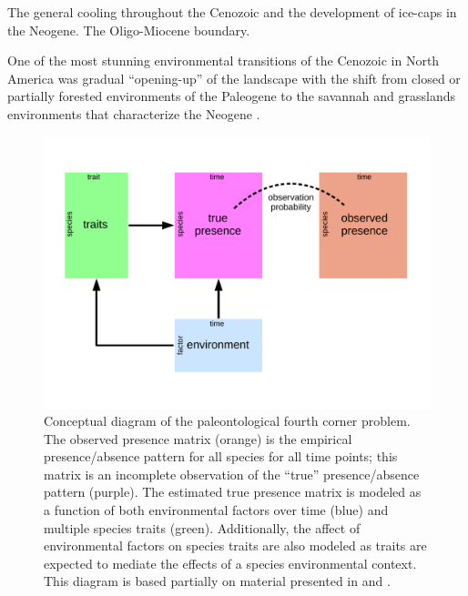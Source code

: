 \documentclass[12pt,letterpaper]{article}
\begin{document}
The general cooling throughout the Cenozoic and the development of ice-caps in the Neogene. The Oligo-Miocene boundary. 

One of the most stunning environmental transitions of the Cenozoic in North America was gradual ``opening-up'' of the landscape with the shift from closed or partially forested environments of the Paleogene to the savannah and grasslands environments that characterize the Neogene \citep{Blois2009,Janis1993a,Janis2000,Stromberg2005}.





\begin{figure}[ht]
  \centering
  \includegraphics[width=\textwidth,height=0.8\textheight,keepaspectratio=true]{figure/paleo_fourth_corner}
  \caption[Conceptual diagram of the paleontological fourth-courner problem]{Conceptual diagram of the paleontological fourth corner problem. The observed presence matrix (orange) is the empirical presence/absence pattern for all species for all time points; this matrix is an incomplete observation of the ``true'' presence/absence pattern (purple). The estimated true presence matrix is modeled as a function of both environmental factors over time (blue) and multiple species traits (green). Additionally, the affect of environmental factors on species traits are also modeled as traits are expected to mediate the effects of a species environmental context. This diagram is based partially on material presented in \citet{Brown2014c} and \citet{Warton2015a}.}
  \label{fig:concept_fourth_corner}
\end{figure}
\end{document}
